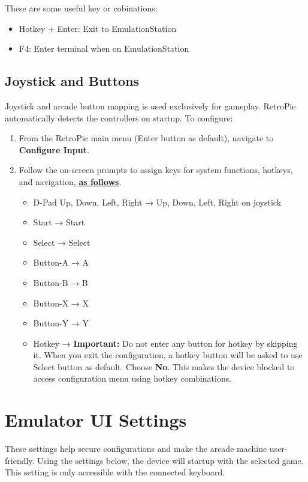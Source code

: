 These are some useful key or cobinations:
\begin{itemize}
  \item Hotkey + Enter: Exit to EmulationStation
  \item F4: Enter terminal when on EmulationStation
\end{itemize}

\subsection{Joystick and Buttons}
\label{subsec:joystick_buttons}

Joystick and arcade button mapping is used exclusively for gameplay. RetroPie automatically detects the controllers on startup. To configure:

\begin{enumerate}
  \item From the RetroPie main menu (Enter button as default), navigate to \textbf{Configure Input}.
  \item Follow the on-screen prompts to assign keys for system functions, hotkeys, and navigation, \textbf{\underline{as follows}}.
    \begin{itemize}
      \item D-Pad Up, Down, Left, Right → Up, Down, Left, Right on joystick
      \item Start → Start
      \item Select → Select
      \item Button-A → A
      \item Button-B → B
      \item Button-X → X
      \item Button-Y → Y
      \item Hotkey → \textbf{Important:} Do not enter any button for hotkey by skipping it. When you exit the configuration, a hotkey button will be asked to use Select button as default. Choose \textbf{No}. This makes the device blocked to access configuration menu using hotkey combinations.
    \end{itemize}
\end{enumerate}

\section{Emulator UI Settings}
\label{sec:emulator_settings}

These settings help secure configurations and make the arcade machine user-friendly. Using the settings below, the device will startup with the selected game. This setting is only accessible with the connected keyboard.

